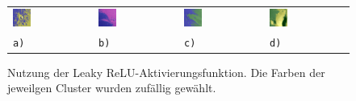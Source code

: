 \begin{figure}[h!]
	\begin{tabular}{m{}m{}m{}m{}}
		\includegraphics[width=0.24\textwidth]{images/gen/activation_functions/p03_01.png_leakyrelu.png} &
		\includegraphics[width=0.24\textwidth]{images/gen/activation_functions/p03_02.png_leakyrelu.png} &
		\includegraphics[width=0.24\textwidth]{images/gen/activation_functions/p03_03.png_leakyrelu.png} &
		\includegraphics[width=0.24\textwidth]{images/gen/activation_functions/p03_04.png_leakyrelu.png} \\
		
		\vspace*{2pt}\centering \texttt{a)} & 
		\vspace*{2pt}\centering \texttt{b)} &
		\vspace*{2pt}\centering \texttt{c)} &
		\vspace*{2pt}\centering \texttt{d)} 
	\end{tabular}
	\caption{Nutzung der Leaky ReLU-Aktivierungsfunktion. Die Farben der jeweilgen Cluster wurden zufällig gewählt.\\}
	\label{fig:leaky_relu_application}
\end{figure}

